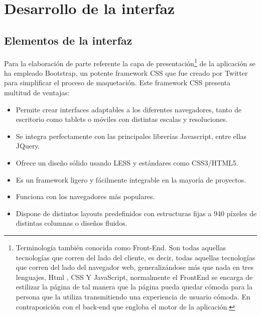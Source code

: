 

\chapter{ Desarrollo de la interfaz }

\label{chap:desarrollo-frontend}

\section {Elementos de la interfaz}

Para la elaboración de parte referente la capa de presentación\footnote{ Terminología también conocida como Front-End. Son todas aquellas tecnologías que corren del lado del cliente, es decir, todas aquellas tecnologías que corren del lado del navegador web, generalizándose más que nada en tres lenguajes, Html , CSS Y JavaScript, normalmente el FrontEnd se encarga de estilizar la página de tal manera que la página pueda quedar cómoda para la persona que la utiliza transmitiendo una experiencia de usuario cómoda. En contraposición con el back-end que engloba el motor de la aplicación.} de la aplicación se ha empleado Bootstrap, un potente framework CSS que fue creado por Twitter para simplificar el proceso de maquetación. Este framework CSS presenta multitud de ventajas:

\begin{itemize}
  \item Permite crear interfaces adaptables a los diferentes navegadores, tanto de escritorio como tablets o móviles con distintas escalas y resoluciones.

  \item Se integra perfectamente con las principales librerías Javascript, entre ellas JQuery.

  \item Ofrece un diseño sólido usando LESS y estándares como CSS3/HTML5.

  \item Es un framework ligero y fácilmente integrable en la mayoría de proyectos.

  \item Funciona con los navegadores más populares.

  \item Dispone de distintos layouts predefinidos con estructuras fijas a 940 píxeles de distintas columnas o diseños fluidos.
\end{itemize}

